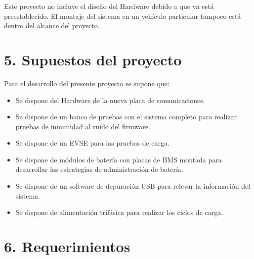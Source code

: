 \documentclass[
11pt, %
codirector, %
]{charter}
\begin{document}
Este proyecto no incluye el diseño del Hardware debido a que ya está preestablecido. El montaje del sistema en un vehículo particular tampoco está dentro del alcance del proyecto.


\section{5. Supuestos del proyecto}
\label{sec:supuestos}

Para el desarrollo del presente proyecto se supone que:

\begin{itemize}
	\item Se dispone del Hardware de la nueva placa de comunicaciones.
	\item Se dispone de un banco de pruebas con el sistema completo para realizar pruebas de inmunidad al ruido del firmware.
	\item Se dispone de un EVSE para las pruebas de carga.
	\item Se dispone de módulos de batería con placas de BMS montada para desarrollar las estrategias de administración de batería.
	\item Se dispone de un software de depuración USB para relevar la información del sistema.
	\item Se dispone de alimentación trifásica para realizar los ciclos de carga.
\end{itemize}


\section{6. Requerimientos}
\label{sec:requerimientos}
\end{document}
